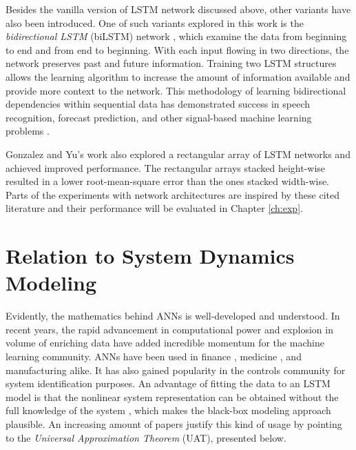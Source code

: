 Besides the vanilla version of LSTM network discussed above, other variants have also been introduced. One of such variants explored in this work is the \emph{bidirectional LSTM} (biLSTM) network \cite{brnn_schuster}, which examine the data from beginning to end and from end to beginning. With each input flowing in two directions, the network preserves past and future information. Training two LSTM structures allows the learning algorithm to increase the amount of information available and provide more context to the network. This methodology of learning bidirectional dependencies within sequential data has demonstrated success in speech recognition, forecast prediction, and other signal-based machine learning problems  \cite{bilstm_speech, bilstm_speech2, bilstm_pred}. 

Gonzalez and Yu's work \cite{gonzalez} also explored a rectangular array of LSTM networks and achieved improved performance. The rectangular arrays stacked height-wise resulted in a lower root-mean-square error than the ones stacked width-wise. Parts of the experiments with network architectures are inspired by these cited literature and their performance will be evaluated in Chapter \ref{ch:exp}. 

\section{Relation to System Dynamics Modeling} \label{ch:ml:relation}

Evidently, the mathematics behind ANNs is well-developed and understood. In recent years, the rapid advancement in computational power and explosion in volume of enriching data have added incredible momentum for the machine learning community. ANNs have been used in finance \cite{ann_finance}, medicine \cite{ann_med}, and manufacturing \cite{ann_manu} alike. It has also gained popularity in the controls community for system identification purposes. An advantage of fitting the data to an LSTM model is that the nonlinear system representation can be obtained without the full knowledge of the system \cite{wagh}, which makes the black-box modeling approach plausible. An increasing amount of papers \cite{gonzalez, wang} justify this kind of usage by pointing to the \emph{Universal Approximation Theorem} (UAT), presented below.

